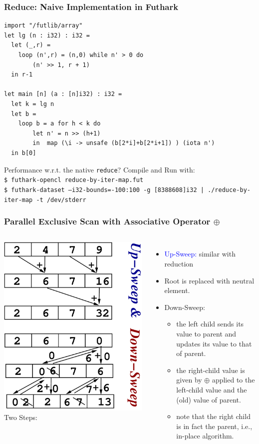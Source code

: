 \documentclass{beamer}
\newcommand{\blue}[1]{\textcolor{Blue}{{#1}}}
\newcommand{\emp}[1]{\textcolor{DikuRed}{ #1}}
\begin{document}
\begin{frame}[fragile,t]
  \frametitle{Reduce: Naive Implementation in Futhark}

  \begin{lstlisting}
import "/futlib/array"
let lg (n : i32) : i32 =
  let (_,r) =
    loop (n',r) = (n,0) while n' > 0 do
        (n' >> 1, r + 1)
  in r-1

let main [n] (a : [n]i32) : i32 =
  let k = lg n
  let b = 
    loop b = a for h < k do
        let n' = n >> (h+1)
        in  map (\i -> unsafe (b[2*i]+b[2*i+1]) ) (iota n')
  in b[0]
\end{lstlisting}

\alert{Performance w.r.t. the native {\tt reduce}?} Compile and Run with:\\
{\tt\$ futhark-opencl reduce-by-iter-map.fut}\\
{\tt\$ futhark-dataset --i32-bounds=-100:100 -g [8388608]i32 | ./reduce-by-iter-map -t /dev/stderr}

\end{frame}

\begin{frame}[fragile,t]
  \frametitle{Parallel Exclusive Scan with Associative Operator $\oplus$}
\bigskip

\begin{columns}
        \includegraphics[height=33ex]{Figures/L2/ScanEg.pdf} 
Two Steps:
\begin{itemize}
    \item \blue{Up-Sweep:} similar with reduction
    \item Root is replaced with neutral element.
    \item \emp{Down-Sweep:} 
    \begin{itemize}
        \item the left child sends its value to parent and 
                updates its value to that of parent.
        \item the right-child value is given by $\oplus$ 
                applied to the left-child value and
                the (old) value of parent.
        \item note that the right child is in fact the parent,
                i.e., in-place algorithm.
    \end  {itemize}
\end  {itemize}
\end{columns}


\end{frame}
\end{document}
